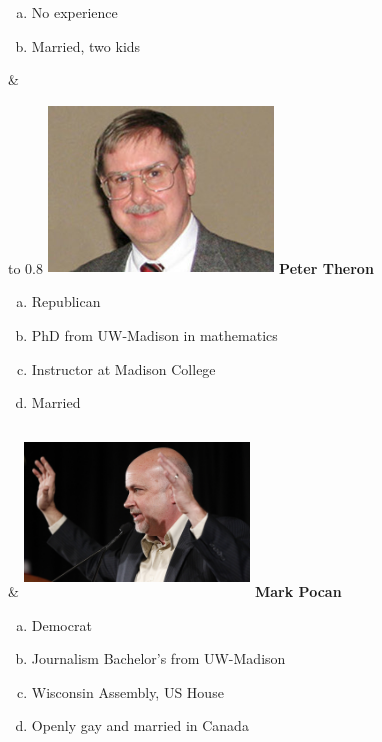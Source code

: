 \documentclass[twoside]{article}
\begin{document}
\begin{center}
\begin{tabu}
\begin{enumerate}[a)]
                \item No experience
                \item Married, two kids
              \end{enumerate}
              & \\
            \end{tabu}\newpage
            \begin{tabu} to 0.8\textwidth { X[c] X[c]}
              \includegraphics[width=6cm,height=4.5cm,keepaspectratio]{images/profiles/theron.jpg}
              \vskip0.5cm
              {\bfseries\Large Peter Theron}
              \begin{enumerate}[a)]
                \item Republican
                \item PhD from UW-Madison in mathematics
                \item Instructor at Madison College
                \item Married
              \end{enumerate}
              &
              \includegraphics[width=6cm,height=4.5cm,keepaspectratio]{images/profiles/pocan.jpg}
              \vskip0.5cm
              {\bfseries\Large Mark Pocan}
              \begin{enumerate}[a)]
                \item Democrat
                \item Journalism Bachelor's from UW-Madison
                \item Wisconsin Assembly, US House
                \item Openly gay and married in Canada
              \end{enumerate}
            \end{tabu}
          \end{center}
          \newpage
\end{document}
